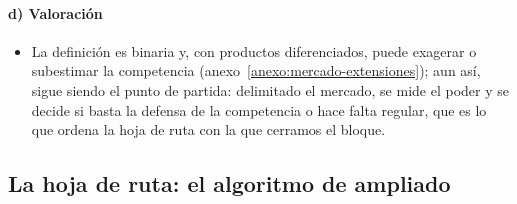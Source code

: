 \documentclass[11pt]{article}
\begin{document}
\paragraph{d) Valoración}

\begin{itemize}
\item La definición es binaria y, con productos diferenciados, puede exagerar o subestimar la competencia\nocite{FarrellShapiro2010Antitrust} (anexo~\ref{anexo:mercado-extensiones}); aun así, sigue siendo el punto de partida: delimitado el mercado, se mide el poder y se decide si basta la defensa de la competencia o hace falta regular, que es lo que ordena la hoja de ruta con la que cerramos el bloque.
\end{itemize}

\subsection{La hoja de ruta: el algoritmo de  ampliado}\label{sec:algoritmo}
\end{document}
